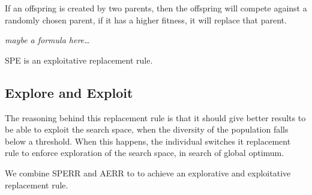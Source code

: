 If an offspring is created by two parents, then the offspring will compete against a randomly chosen parent, if it has a higher fitness, it will replace that parent.

\emph{maybe a formula here\dots}

SPE is an exploitative replacement rule.

\subsection{Explore and Exploit}
The reasoning behind this replacement rule is that it should give better results to be able to exploit the search space, when the diversity of the population falls below a threshold. When this happens, the individual switches it replacement rule to enforce exploration of the search space, in search of global optimum.

We combine SPERR and AERR to to achieve an explorative and exploitative replacement rule.
